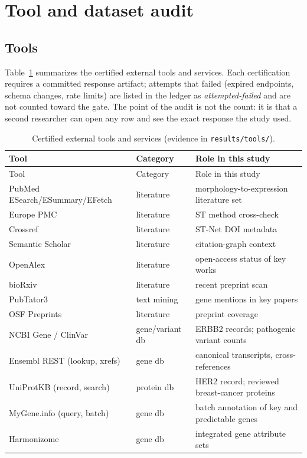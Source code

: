 \documentclass[11pt]{article}
\begin{document}
\section{Tool and dataset audit}
\subsection{Tools}
Table~\ref{tab:tools} summarizes the \numTools{} certified external tools and
services. Each certification requires a committed response artifact; attempts that
failed (expired endpoints, schema changes, rate limits) are listed in the ledger as
\emph{attempted-failed} and are not counted toward the gate. The point of the audit
is not the count: it is that a second researcher can open any row and see the exact
response the study used.

\begin{longtable}{p{4.2cm}p{2.6cm}p{8.2cm}}
\caption{Certified external tools and services (evidence in \texttt{results/tools/}).}\label{tab:tools}\\
\toprule
Tool & Category & Role in this study \\
\midrule
\endfirsthead
\toprule Tool & Category & Role in this study \\ \midrule \endhead
PubMed ESearch/ESummary/EFetch & literature & morphology-to-expression literature set \\
Europe PMC & literature & ST method cross-check \\
Crossref & literature & ST-Net DOI metadata \\
Semantic Scholar & literature & citation-graph context \\
OpenAlex & literature & open-access status of key works \\
bioRxiv & literature & recent preprint scan \\
PubTator3 & text mining & gene mentions in key papers \\
OSF Preprints & literature & preprint coverage \\
NCBI Gene / ClinVar & gene/variant db & ERBB2 records; pathogenic variant counts \\
Ensembl REST (lookup, xrefs) & gene db & canonical transcripts, cross-references \\
UniProtKB (record, search) & protein db & HER2 record; reviewed breast-cancer proteins \\
MyGene.info (query, batch) & gene db & batch annotation of key and predictable genes \\
Harmonizome & gene db & integrated gene attribute sets \\

\end{longtable}
\end{document}
